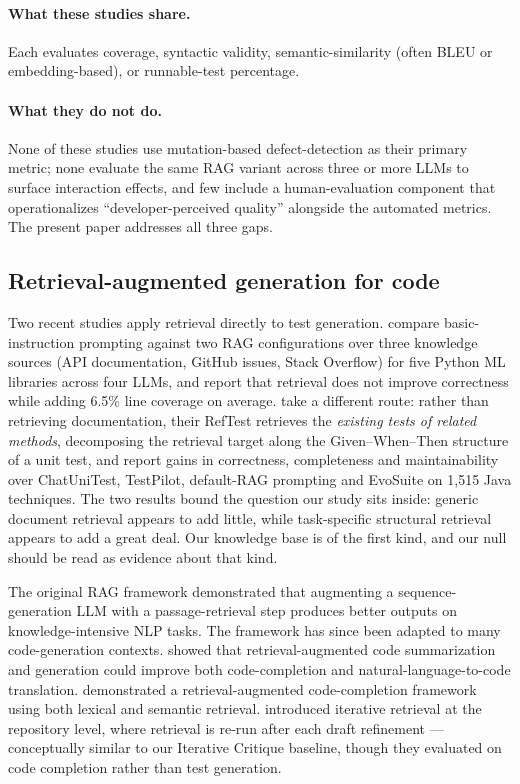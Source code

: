 \documentclass[smallextended]{svjour3}
\begin{document}
\paragraph{What these studies share.}
Each evaluates coverage, syntactic validity, semantic-similarity
(often BLEU or embedding-based), or runnable-test percentage.

\paragraph{What they do not do.}
None of these studies use mutation-based defect-detection as their
primary metric; none evaluate the same RAG variant across three or
more LLMs to surface interaction effects, and few include a
human-evaluation component that operationalizes
``developer-perceived quality'' alongside the automated metrics.
The present paper addresses all three gaps.

\subsection{Retrieval-augmented generation for code}\label{sec:related-rag}

Two recent studies apply retrieval directly to test generation.
\citet{shin2026ragtest} compare basic-instruction prompting against
two RAG configurations over three knowledge sources (API
documentation, GitHub issues, Stack Overflow) for five Python ML
libraries across four LLMs, and report that retrieval does not
improve correctness while adding 6.5\% line coverage on average.
\citet{zhang2026refrag} take a different route: rather than
retrieving documentation, their RefTest retrieves the \emph{existing
tests of related methods}, decomposing the retrieval target along
the Given--When--Then structure of a unit test, and report gains in
correctness, completeness and maintainability over ChatUniTest,
TestPilot, default-RAG prompting and EvoSuite on 1{,}515 Java
techniques. The two results bound the question our study sits inside:
generic document retrieval appears to add little, while
task-specific structural retrieval appears to add a great deal. Our
knowledge base is of the first kind, and our null should be read as
evidence about that kind.

The original RAG framework \citep{lewis2020} demonstrated that
augmenting a sequence-generation LLM with a passage-retrieval step
produces better outputs on knowledge-intensive NLP tasks. The
framework has since been adapted to many code-generation contexts.
\citet{parvez2021} showed that retrieval-augmented code summarization
and generation could improve both code-completion and
natural-language-to-code translation. \citet{lu2022reacc}
demonstrated a retrieval-augmented code-completion framework using
both lexical and semantic retrieval. \citet{zhang2023repocoder}
introduced iterative retrieval at the repository level, where
retrieval is re-run after each draft refinement
—conceptually similar to our Iterative Critique baseline, though they evaluated
on code completion rather than test generation.
\end{document}
